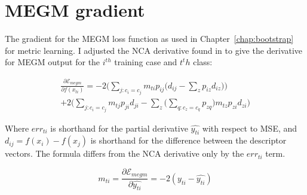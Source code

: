 \chapter{MEGM gradient}
\label{chap:megm_appendix} 

The gradient for the \gls{MEGM} loss function as used in Chapter~\ref{chap:bootstrap} for metric learning. I adjusted the \gls{NCA} derivative found in \cite {Salakhutdinov2007a} to give the derivative for \gls{MEGM} output for the $ i^{th} $ training case and $ t^th $ class:

\begin{multline}
\label{eq:megm_grad}
\frac{\partial \mathcal{E}_{megm}}{\partial f(x_{ti})} = 
  -2 \bigg( \sum_{j:c_i = c_j}  m_{ti} {p_{ij} \Big( d_{ij} - \sum_z{p_{iz}d_{iz}} \Big) } \bigg)\\
  +2 \bigg( \sum_{j:c_i = c_j} m_{tj}{p_{ji}d_{ji} - \sum_z{\Big( \sum_{q:c_z = c_q}{p_{zq}} \Big) m_{tz}p_{zi}d_{zi}   }} \bigg)
\end{multline}

Where $ err_{ti} $ is shorthand for the partial derivative $ \hat{y_{ti}} $ with respect to \gls{MSE}, and $ d_{ij} = f(x_i) - f(x_j) $ is shorthand for the difference between the descriptor vectors. The formula differs from the \gls{NCA} derivative only by the $ err_{ti} $ term.

\begin{equation}
m_{ti} = \frac{\partial \mathcal{E}_{megm}}{\partial \hat{y_{ti}}} = -2 (y_{ti} - \hat{y_{ti}})
\label{eq:megm_partial}
\end{equation}